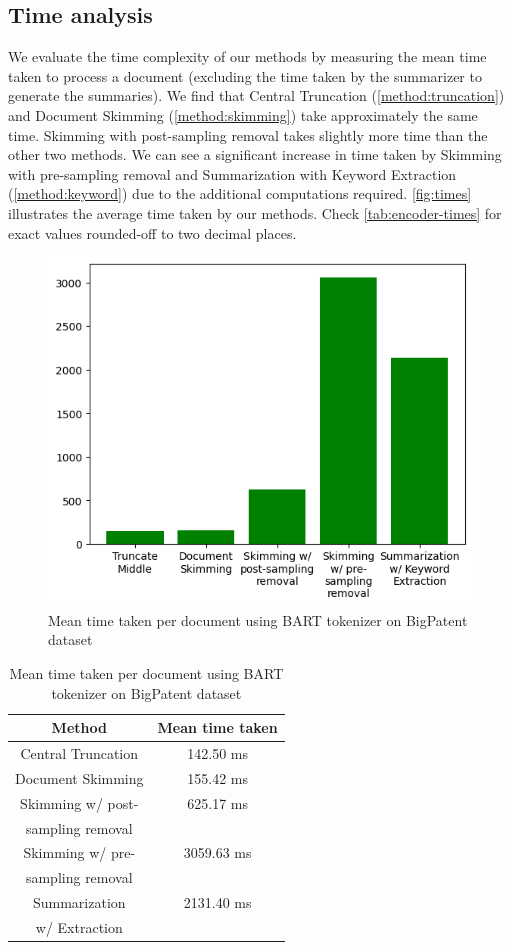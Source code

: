 \subsection*{Time analysis}

We evaluate the time complexity of our methods by measuring the mean time taken to process
a document (excluding the time taken by the summarizer to generate the summaries).
We find that Central Truncation (\ref{method:truncation}) and Document Skimming
(\ref{method:skimming}) take approximately the same time.
Skimming with post-sampling removal takes slightly more time than the other two methods.
We can see a significant increase in time taken by Skimming with pre-sampling removal
and Summarization with Keyword Extraction (\ref{method:keyword}) due to the additional
computations required.
\autoref{fig:times} illustrates the average time taken by our methods.
Check \autoref{tab:encoder-times} for exact values rounded-off to two decimal places.

\begin{figure}[!ht]
	\centering
	\includegraphics[width=.48\textwidth]{Images/encoder-times.png}
	\caption{Mean time taken per document using BART tokenizer on BigPatent dataset}
	\label{fig:times}
\end{figure}

\begin{table}[!ht]
	\centering

	\begin{tabular}{c c}
		\hline
		Method & Mean time taken \\
		\hline
		Central Truncation & 142.50 ms \\
		Document Skimming & 155.42 ms \\
		Skimming w/ post- & 625.17 ms \\
		sampling removal & \\
		Skimming w/ pre- & 3059.63 ms \\
		sampling removal & \\
		Summarization & 2131.40 ms \\
		w/ Extraction & \\
		\hline
	\end{tabular}

	\caption{Mean time taken per document using BART tokenizer on BigPatent dataset}
	\label{tab:encoder-times}
\end{table}
